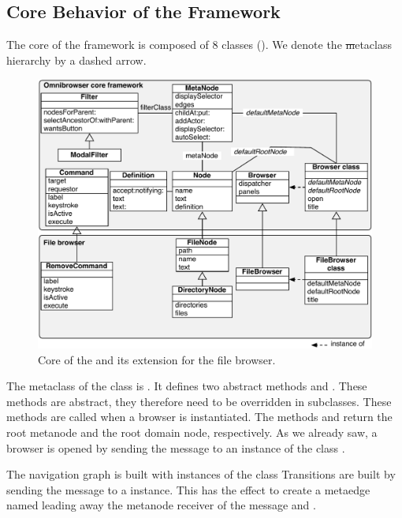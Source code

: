\documentclass[a4paper,10pt,twoside]{book}
\begin{document}
\subsection{Core Behavior of the Framework}\label{sec:corebehavior}

The core of the \ob framework is composed of 8 classes (). We denote the \st metaclass hierarchy by a dashed arrow. 

\begin{figure}[!ht]
\begin{center}
\includegraphics[scale=0.52]{Core}
\caption{Core of the \obf and its extension for the file browser.} 
\end{center}
\end{figure}

The metaclass of the class  is . It defines two abstract methods  and . These methods are abstract, they therefore need to be overridden in subclasses. These methods are called when a browser is instantiated. The methods   and  return the root metanode and the root domain node, respectively. As we already saw, a browser is opened by sending the message  to an instance of the class .

The navigation graph is built with instances of the class  Transitions are built by sending the message  to a  instance. This has the effect to create a metaedge named  leading away the metanode receiver of the message and .
\end{document}
